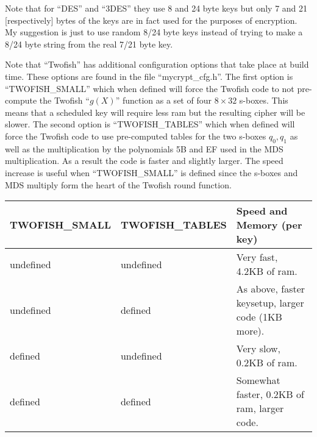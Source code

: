 \documentclass[b5paper]{book}
\begin{document}
Note that for ``DES'' and ``3DES'' they use 8 and 24 byte keys but only 7 and 21 [respectively] bytes of the keys are in
fact used for the purposes of encryption.  My suggestion is just to use random 8/24 byte keys instead of trying to make a 8/24
byte string from the real 7/21 byte key.

Note that ``Twofish'' has additional configuration options that take place at build time.  These options are found in
the file ``mycrypt\_cfg.h''.  The first option is ``TWOFISH\_SMALL'' which when defined will force the Twofish code
to not pre-compute the Twofish ``$g(X)$'' function as a set of four $8 \times 32$ s-boxes.  This means that a scheduled
key will require less ram but the resulting cipher will be slower.  The second option is ``TWOFISH\_TABLES'' which when
defined will force the Twofish code to use pre-computed tables for the two s-boxes $q_0, q_1$ as well as the multiplication
by the polynomials 5B and EF used in the MDS multiplication.  As a result the code is faster and slightly larger.  The
speed increase is useful when ``TWOFISH\_SMALL'' is defined since the s-boxes and MDS multiply form the heart of the
Twofish round function.

\begin{small}
\begin{center}
\begin{tabular}{|l|l|l|}
\hline TWOFISH\_SMALL & TWOFISH\_TABLES & Speed and Memory (per key) \\
\hline undefined & undefined & Very fast, 4.2KB of ram. \\
\hline undefined & defined & As above, faster keysetup, larger code (1KB more). \\
\hline defined & undefined & Very slow, 0.2KB of ram. \\
\hline defined & defined & Somewhat faster, 0.2KB of ram, larger code. \\
\hline
\end{tabular}
\end{center}
\end{small}
\end{document}
